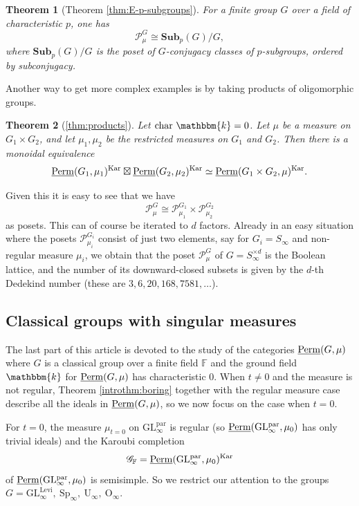 \documentclass[11pt,a4paper]{amsart}
\theoremstyle{plain}%
\newtheorem{introtheorem}{Theorem}
\theoremstyle{definition}
\theoremstyle{remark}
\newcommand{\Perm}{\underline{{\rm Perm}}}
\newcommand{\F}{{\mathbb F}}
\newcommand{\kk}{\mathbbm{k}}
\newcommand{\Kar}{\mathrm{Kar}}
\newcommand{\Sub}{\mathbf{Sub}}
\begin{document}
\begin{introtheorem}[Theorem \ref{thm:E-p-subgroups}]
For a finite group $G$ over a field of characteristic $p$, one has
\[
\mathcal P_\mu^G\cong \Sub_p(G)/G,
\]
where $\Sub_p(G)/G$ is the poset of $G$-conjugacy classes of $p$-subgroups, ordered by subconjugacy.  
\end{introtheorem}

Another way to get {more} complex examples is by taking products of oligomorphic groups.  

\begin{introtheorem}[\cref{thm:products}]
Let $\mathrm{char}~\kk=0$. Let $\mu$ be a measure on $G_1\times G_2$, and let $\mu_1,\mu_2$ be the restricted measures on $G_1$ and $G_2$. Then there is a
monoidal equivalence
\[ \Perm(G_1,\mu_1)^{\Kar}\boxtimes \Perm(G_2,\mu_2)^{\Kar}
 \simeq \Perm(G_1\times G_2,\mu)^{\Kar}. \]
\end{introtheorem}

Given this it is easy to see that we have
\[
  \mathcal{P}_{\mu}^G\cong \mathcal{P}_{\mu_1}^{G_1}\times \mathcal{P}_{\mu_2}^{G_2}
\]
as posets. This can of course be iterated to $d$ factors. Already in an easy situation where the posets $\mathcal{P}_{\mu_i}^{G_i}$ consist of just two elements, say for $G_i = S_\infty$ and non-regular measure $\mu_i$, we obtain that the poset $\mathcal{P}_{\mu}^G$ of $G = S_\infty^{\times d}$ is the Boolean lattice, and the number of its downward-closed subsets is given by the $d$-th Dedekind number (these are $3, 6, 20, 168, 7581, \ldots$).


\subsection{Classical groups with singular measures}

The last part of this article is devoted to the study of the categories $\Perm(G,\mu)$ where $G$ is a classical group over a finite field $\F$ and the ground field $\kk$ for $\Perm(G,\mu)$ has characteristic $0$. When $t \neq 0$ and the measure is not regular, Theorem \ref{introthm:boring} together with the regular measure case describe all the ideals in $\Perm(G, \mu)$, so we now focus on the case when $t=0$. 

 For $t=0$, the measure $\mu_{t=0}$ on $\mathrm{GL^{par}_{\infty}}$ is regular (so $\Perm(\mathrm{GL^{par}_{\infty}}, \mu_{0})$ has only trivial ideals) and the Karoubi completion $$\mathscr{G}_{\F}=\Perm(\mathrm{GL^{par}_{\infty}},\mu_0)^{\Kar}$$ of $\Perm(\mathrm{GL^{par}_{\infty}},\mu_0)$ is semisimple. So we restrict our attention to the groups $G=\mathrm{GL^{Levi}_{\infty}, ~Sp_{\infty},~ U_{\infty},~ O_{\infty}}$.
\end{document}
